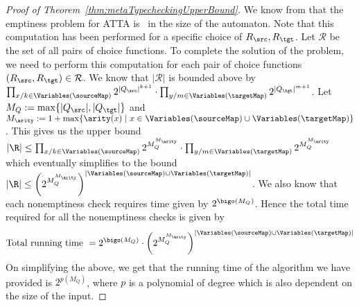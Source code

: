 \begin{proof}[Proof of Theorem~\ref{thm:metaTypecheckingUpperBound}]
  We know from \cite{tata} that the emptiness problem for ATTA is \exptc\ in the size of the automaton. Note that this computation has been performed for a specific choice of $R_\src, R_\tgt$. Let $\mathcal{R}$ be the set of all pairs of choice functions. To complete the solution of the problem, we need to perform this computation for each pair of choice functions $(R_\src, R_\tgt) \in \mathcal{R}$. We know that $|\mathcal{R}|$ is bounded above by $\prod_{x/k \in \Variables(\sourceMap)}2^{|Q_\src|^{k+1}} \cdot \prod_{y/m \in \Variables(\targetMap)}2^{|Q_\tgt|^{m+1}}$. Let $M_Q := \max\{|Q_\src|, |Q_\tgt|\}$ and $M_\arity := 1+\max\{\arity(x) \mid x \in \Variables(\sourceMap) \cup \Variables(\targetMap)\}$. This gives us the upper bound $|\R| \leq \prod_{x/k \in \Variables(\sourceMap)}2^{M_Q^{M_\arity}} \cdot \prod_{y/m \in \Variables(\targetMap)}2^{M_Q^{M_\arity}}$ which eventually simplifies to the bound $|\R| \leq \left(2^{M_Q^{M_\arity}}\right)^{|\Variables(\sourceMap) \cup \Variables(\targetMap)|}$. We also know that each nonemptiness check requires time given by $2^{\bigo(M_Q)}$. Hence the total time required for all the nonemptiness checks is given by
  \[ \mbox{Total running time } = 2^{\bigo(M_Q)} \cdot \left(2^{M_Q^{M_\arity}}\right)^{|\Variables(\sourceMap) \cup \Variables(\targetMap)|} \]
  On simplifying the above, we get that the running time of the algorithm we have provided is $2^{p(M_Q)}$, where $p$ is a polynomial of degree which is also dependent on the size of the input.
\end{proof}